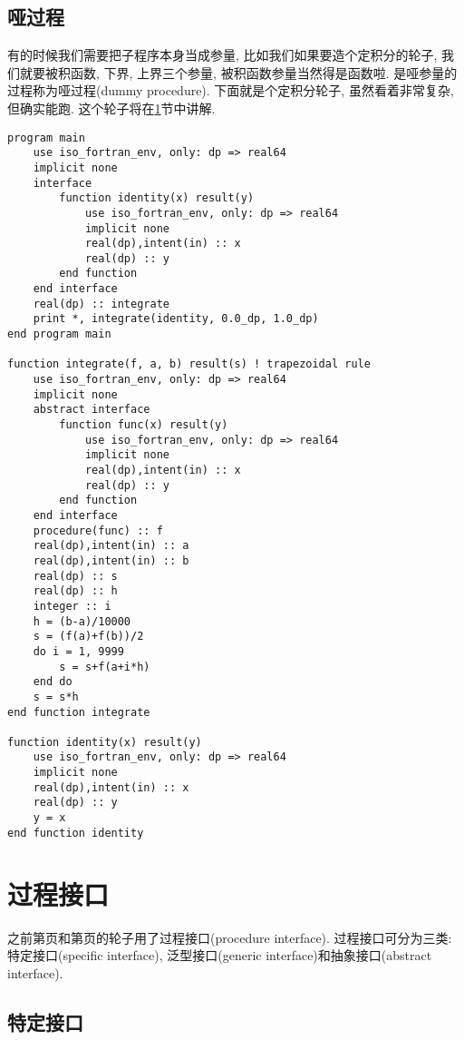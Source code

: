 \subsection{哑过程}
有的时候我们需要把子程序本身当成参量, 比如我们如果要造个定积分的轮子, 我们就要被积函数, 下界, 上界三个参量, 被积函数参量当然得是函数啦. 是哑参量的过程称为哑过程(dummy procedure). 下面就是个定积分轮子, 虽然看着非常复杂, 但确实能跑. 这个轮子将在\ref{fortran_interface}节中讲解.\label{dummy_procedure_program}
\begin{verbatim}
program main
    use iso_fortran_env, only: dp => real64
    implicit none
    interface
        function identity(x) result(y)
            use iso_fortran_env, only: dp => real64
            implicit none
            real(dp),intent(in) :: x
            real(dp) :: y
        end function
    end interface
    real(dp) :: integrate
    print *, integrate(identity, 0.0_dp, 1.0_dp)
end program main

function integrate(f, a, b) result(s) ! trapezoidal rule
    use iso_fortran_env, only: dp => real64
    implicit none
    abstract interface
        function func(x) result(y)
            use iso_fortran_env, only: dp => real64
            implicit none
            real(dp),intent(in) :: x
            real(dp) :: y
        end function
    end interface
    procedure(func) :: f
    real(dp),intent(in) :: a
    real(dp),intent(in) :: b
    real(dp) :: s
    real(dp) :: h
    integer :: i
    h = (b-a)/10000
    s = (f(a)+f(b))/2
    do i = 1, 9999
        s = s+f(a+i*h)
    end do
    s = s*h
end function integrate

function identity(x) result(y)
    use iso_fortran_env, only: dp => real64
    implicit none
    real(dp),intent(in) :: x
    real(dp) :: y
    y = x
end function identity
\end{verbatim}

\section{过程接口}\label{fortran_interface}

之前第\pageref{assumed-shape_array_program}页和第\pageref{dummy_procedure_program}页的轮子用了过程接口(procedure interface). 过程接口可分为三类: 特定接口(specific interface), 泛型接口(generic interface)和抽象接口(abstract interface).

\subsection{特定接口}

